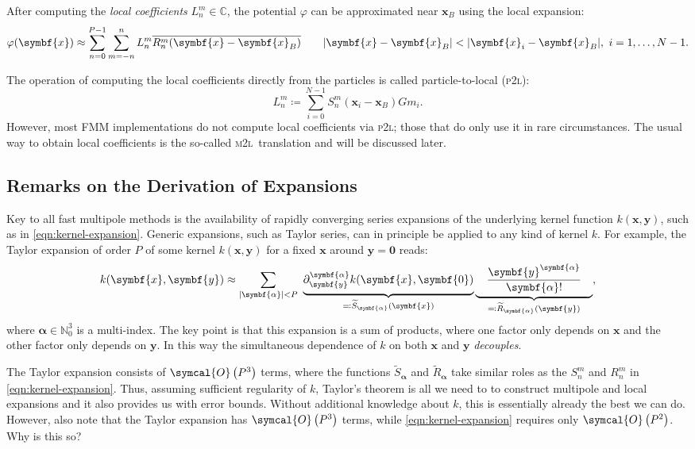 \documentclass{scrbook}
\newcommand{\PtoL}{\textsc{p2l}}
\newcommand{\MtoL}{\textsc{m2l}}
\newcommand{\naturals}{\ensuremath{\mathbb{N}}}
\newcommand{\complex}{\mathbb{C}}
\newcommand{\vv}[1]{\ensuremath{\symbf{#1}}} %
\newcommand{\bigO}[1]{\ensuremath{\symcal{O}\left({#1}\right)}}
\begin{document}
After computing the \emph{local coefficients} $L_n^m\in\complex$, the potential
$\varphi$ can be approximated near $\vv{x}_B$ using the local expansion:
\begin{equation}
\varphi(\vv{x})\approx\sum_{n=0}^{P-1}\sum_{m=-n\vphantom{0}}^{n}
L_n^m\overline{R_n^m(\vv{x}-\vv{x}_B)}\qquad
|\vv{x}-\vv{x}_B| < |\vv{x}_i-\vv{x}_B|,\ i=1,\dotsc,N-1.
\end{equation}

The operation of computing the local coefficients directly from the particles
is called particle-to-local (\PtoL):
\begin{equation}\label{eqn:p2l}
L_n^m\coloneqq\sum_{i=0}^{N-1}S_n^m(\vv{x}_i-\vv{x}_B)Gm_i.
\end{equation}
However, most FMM implementations do not compute local coefficients via
\PtoL; those that do only use it in rare circumstances. The usual way to
obtain local coefficients is the so-called \MtoL\ translation and will be
discussed later.

\subsection{Remarks on the Derivation of Expansions}
Key to all fast multipole methods is the availability of rapidly converging
series expansions of the underlying kernel function $k(\vv{x},\vv{y})$, such
as in \cref{eqn:kernel-expansion}. Generic expansions, such as Taylor series,
can in principle be applied to any kind of kernel $k$. For example,
the Taylor expansion of order $P$ of some kernel $k(\vv{x},\vv{y})$ for a fixed
$\vv{x}$ around $\vv{y}=\vv{0}$ reads:
\begin{equation}\label{eqn:taylor-expansion}
k(\vv{x},\vv{y})\approx \sum_{|\vv{\alpha}|<P}\ 
\underbrace{\partial_{\vv{y}}^{\vv{\alpha}}k(\vv{x},\vv{0})
\vphantom{\frac{a}{b}}}_{\eqqcolon%
\widetilde{S}_{\vv{\alpha}}(\vv{x})}
\underbrace{\quad\frac{\vv{y}^{\vv{\alpha}}}{\vv{\alpha}!}\quad}_{\eqqcolon%
\widetilde{R}_{\vv{\alpha}}(\vv{y})},
\end{equation}
where $\vv{\alpha}\in\naturals^3_0$ is a multi-index. The key point is that
this expansion is a sum of products, where one factor only depends on
$\vv{x}$ and the other factor only depends on $\vv{y}$. In this way the
simultaneous dependence of $k$ on both $\vv{x}$ and $\vv{y}$ \emph{decouples}.

The Taylor expansion consists of \bigO{P^3} terms, where the functions
$\widetilde{S}_{\vv{\alpha}}$ and $\widetilde{R}_{\vv{\alpha}}$ take similar
roles as the $S_n^m$ and $R_n^m$ in \cref{eqn:kernel-expansion}. Thus, assuming
sufficient regularity of $k$, Taylor's theorem is all we need to to construct
multipole and local expansions and it also provides us with error bounds.
Without additional knowledge about $k$, this is essentially already the best we
can do. However, also note that the Taylor expansion has \bigO{P^3} terms,
while \cref{eqn:kernel-expansion} requires only \bigO{P^2}. Why is this so?
\end{document}
